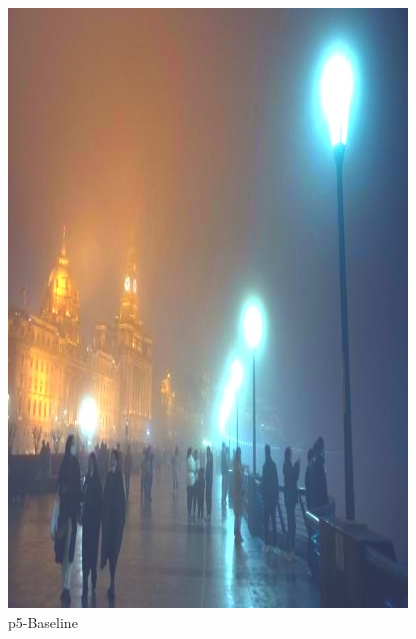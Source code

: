 \documentclass[12pt]{article}
\begin{document}
\begin{figure}[!h]
\begin{minipage}[t]{0.24\linewidth}
        \includegraphics[width=0.9\linewidth]{sample_pictures/after_p5_Baseline.jpg}
        \caption*{p5-Baseline}
    \end{minipage}
    \begin{minipage}[t]{0.24\linewidth}
        \centering

\end{minipage}
\end{figure}
\end{document}
